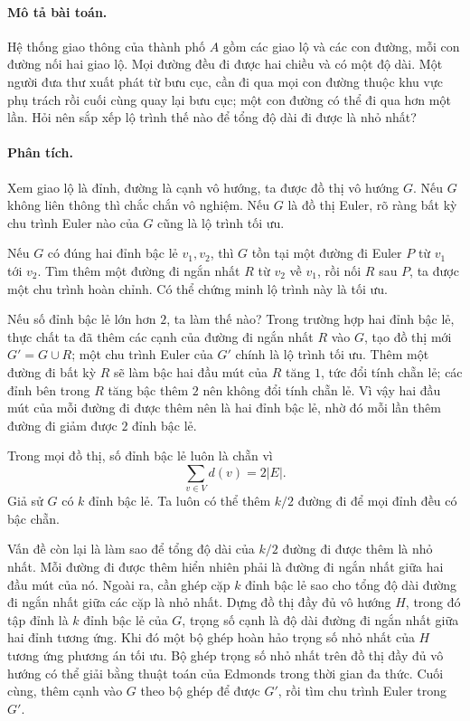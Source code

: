 \documentclass[11pt]{article}
\begin{document}
\paragraph{Mô tả bài toán.}
Hệ thống giao thông của thành phố \(A\) gồm các giao lộ và các con đường, mỗi
con đường nối hai giao lộ. Mọi đường đều đi được hai chiều và có một độ dài.
Một người đưa thư xuất phát từ bưu cục, cần đi qua mọi con đường thuộc khu
vực phụ trách rồi cuối cùng quay lại bưu cục; một con đường có thể đi qua hơn
một lần. Hỏi nên sắp xếp lộ trình thế nào để tổng độ dài đi được là nhỏ nhất?

\paragraph{Phân tích.}
Xem giao lộ là đỉnh, đường là cạnh vô hướng, ta được đồ thị vô hướng \(G\).
Nếu \(G\) không liên thông thì chắc chắn vô nghiệm. Nếu \(G\) là đồ thị Euler,
rõ ràng bất kỳ chu trình Euler nào của \(G\) cũng là lộ trình tối ưu.

Nếu \(G\) có đúng hai đỉnh bậc lẻ \(v_1,v_2\), thì \(G\) tồn tại một đường đi
Euler \(P\) từ \(v_1\) tới \(v_2\). Tìm thêm một đường đi ngắn nhất \(R\) từ
\(v_2\) về \(v_1\), rồi nối \(R\) sau \(P\), ta được một chu trình hoàn chỉnh.
Có thể chứng minh lộ trình này là tối ưu.

Nếu số đỉnh bậc lẻ lớn hơn \(2\), ta làm thế nào? Trong trường hợp hai đỉnh
bậc lẻ, thực chất ta đã thêm các cạnh của đường đi ngắn nhất \(R\) vào \(G\),
tạo đồ thị mới \(G'=G\cup R\); một chu trình Euler của \(G'\) chính là lộ
trình tối ưu. Thêm một đường đi bất kỳ \(R\) sẽ làm bậc hai đầu mút của \(R\)
tăng \(1\), tức đổi tính chẵn lẻ; các đỉnh bên trong \(R\) tăng bậc thêm \(2\)
nên không đổi tính chẵn lẻ. Vì vậy hai đầu mút của mỗi đường đi được thêm nên
là hai đỉnh bậc lẻ, nhờ đó mỗi lần thêm đường đi giảm được \(2\) đỉnh bậc lẻ.

Trong mọi đồ thị, số đỉnh bậc lẻ luôn là chẵn vì
\[
  \sum_{v\in V}d(v)=2|E|.
\]
Giả sử \(G\) có \(k\) đỉnh bậc lẻ. Ta luôn có thể thêm \(k/2\) đường đi để mọi
đỉnh đều có bậc chẵn.

Vấn đề còn lại là làm sao để tổng độ dài của \(k/2\) đường đi được thêm là nhỏ
nhất. Mỗi đường đi được thêm hiển nhiên phải là đường đi ngắn nhất giữa hai
đầu mút của nó. Ngoài ra, cần ghép cặp \(k\) đỉnh bậc lẻ sao cho tổng độ dài
đường đi ngắn nhất giữa các cặp là nhỏ nhất. Dựng đồ thị đầy đủ vô hướng
\(H\), trong đó tập đỉnh là \(k\) đỉnh bậc lẻ của \(G\), trọng số cạnh là độ
dài đường đi ngắn nhất giữa hai đỉnh tương ứng. Khi đó một bộ ghép hoàn hảo
trọng số nhỏ nhất của \(H\) tương ứng phương án tối ưu. Bộ ghép trọng số nhỏ
nhất trên đồ thị đầy đủ vô hướng có thể giải bằng thuật toán của Edmonds trong
thời gian đa thức. Cuối cùng, thêm cạnh vào \(G\) theo bộ ghép để được \(G'\),
rồi tìm chu trình Euler trong \(G'\).
\end{document}
